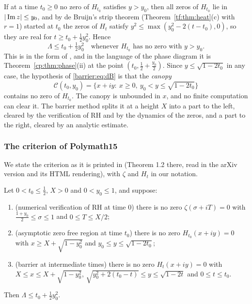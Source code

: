 If at a time $t_0\ge0$ no zero of $H_{t_0}$ satisfies $y>y_0$, then all zeros of $H_{t_0}$ lie in $|\operatorname{Im} z|\le y_0$, and by de Bruijn's strip theorem (Theorem~\ref{tf:thm:heat}(c) with $r=1$) started at $t_0$ the zeros of $H_t$ satisfy $y^2\le\max(y_0^2-2(t-t_0),0)$, so they are real for $t\ge t_0+\frac12y_0^2$. Hence
\begin{equation}\label{barrier:eq:dB}
\Lambda\le t_0+\tfrac12y_0^2\quad\text{whenever $H_{t_0}$ has no zero with } y>y_0 .
\end{equation}
This is \cite[Theorem 13]{deBruijn} in the form of \cite{Polymath}, and in the language of the phase diagram it is Theorem~\ref{cp:thm:phase}(ii) at the point $(t_0,\frac12+\frac{y_0}2)$. Since $y\le\sqrt{1-2t_0}$ in any case, the hypothesis of \eqref{barrier:eq:dB} is that the \emph{canopy}
\[
\mathcal C(t_0,y_0)=\{x+iy:\ x\ge0,\ y_0<y\le\sqrt{1-2t_0}\}
\]
contains no zero of $H_{t_0}$. The canopy is unbounded in $x$, and no finite computation can clear it. The barrier method splits it at a height $X$ into a part to the left, cleared by the verification of RH and by the dynamics of the zeros, and a part to the right, cleared by an analytic estimate.

\subsubsection{The criterion of Polymath15}

We state the criterion as it is printed in \cite{Polymath} (Theorem 1.2 there, read in the arXiv version and its HTML rendering), with $\zeta$ and $H_t$ in our notation.

\begin{theorem}\label{barrier:thm:pm}
Let $0<t_0\le\frac12$, $X>0$ and $0<y_0\le1$, and suppose:
\begin{enumerate}
\item[(i)] (numerical verification of RH at time $0$) there is no zero $\zeta(\sigma+iT)=0$ with $\frac{1+y_0}2\le\sigma\le1$ and $0\le T\le X/2$;
\item[(ii)] (asymptotic zero free region at time $t_0$) there is no zero $H_{t_0}(x+iy)=0$ with $x\ge X+\sqrt{1-y_0^2}$ and $y_0\le y\le\sqrt{1-2t_0}$;
\item[(iii)] (barrier at intermediate times) there is no zero $H_t(x+iy)=0$ with $X\le x\le X+\sqrt{1-y_0^2}$, $\sqrt{y_0^2+2(t_0-t)}\le y\le\sqrt{1-2t}$ and $0\le t\le t_0$.
\end{enumerate}
Then $\Lambda\le t_0+\frac12y_0^2$.
\end{theorem}

